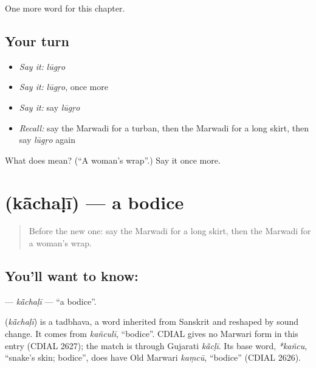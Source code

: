 \begin{grammarlens}[title={What you've built}]
One more word for this chapter.
\end{grammarlens}

\subsection*{Your turn}
\begin{itemize}
\raggedright
  \item \emph{Say it:} \emph{lūgṛo}
  \item \emph{Say it:} \emph{lūgṛo}, once more
  \item \emph{Say it:} say \emph{lūgṛo}
  \item \emph{Recall:} say the Marwadi for a turban, then the Marwadi for a long skirt, then say \emph{lūgṛo} again
\end{itemize}

\begin{tcolorbox}[breakable,colback=teal!4,colframe=teal!35!black,title={Before you move on}]
What does  mean? (\textquotedblleft{}A woman's wrap\textquotedblright{}.) Say it once more.
\end{tcolorbox}
\section[\texorpdfstring{\mw{कांचळी} (kā̃chaḷī)}{कांचळी (kā̃chaḷī)}]{ (kā̃chaḷī) — a bodice}

\label{lesson:MW-C128-kachali}



\begin{quote}
Before the new one: say the Marwadi for a long skirt, then the Marwadi for a woman's wrap.
\end{quote}

\subsection*{You'll want to know: }
\textbf{} — \emph{kā̃chaḷī} — \textquotedblleft{}a bodice\textquotedblright{}.

\begin{cousinweb}
\textbf{} (\emph{kā̃chaḷī}) is a tadbhava, a word inherited from Sanskrit and reshaped by sound change. It comes from \emph{kañculī}, \textquotedblleft{}bodice\textquotedblright{}. CDIAL gives no Marwari form in this entry (CDIAL 2627); the match is through Gujarati \emph{kā̃cḷī}. Its base word, \emph{*kañcu}, \textquotedblleft{}snake's skin; bodice\textquotedblright{}, does have Old Marwari \emph{kaṃcū}, \textquotedblleft{}bodice\textquotedblright{} (CDIAL 2626).
\end{cousinweb}

